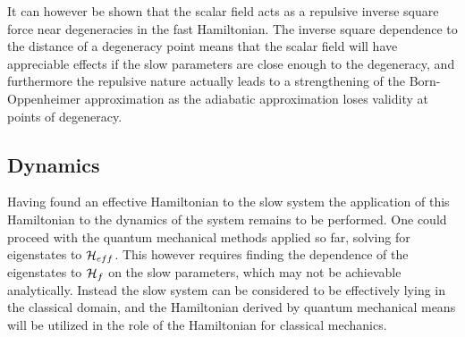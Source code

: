 \documentclass[a4paper]{article}
\begin{document}
It can however be shown that the scalar field acts as a repulsive inverse
square force near degeneracies in the fast Hamiltonian\cite{berrylim}. The inverse square dependence to
the distance of a degeneracy point means that the scalar field will have appreciable
effects if the slow parameters are close enough to the degeneracy, and furthermore the
repulsive nature actually leads to a strengthening of the Born-Oppenheimer approximation as
the adiabatic approximation loses validity at points of degeneracy.
\subsection{Dynamics}
Having found an effective Hamiltonian to the slow system the application of this
Hamiltonian to the dynamics of the system remains to be performed. One could proceed with
the quantum mechanical methods applied so far, solving for eigenstates to \(\mathbb{\cal
H}_{eff}\). This however requires finding the dependence of the eigenstates to
\(\mathbb{\cal H}_f\) on the slow parameters, which may not be achievable analytically.
Instead the slow system can be considered to be effectively lying in the classical domain,
and the Hamiltonian derived by quantum mechanical means will be utilized in the role of the
Hamiltonian for classical mechanics. %
\end{document}
